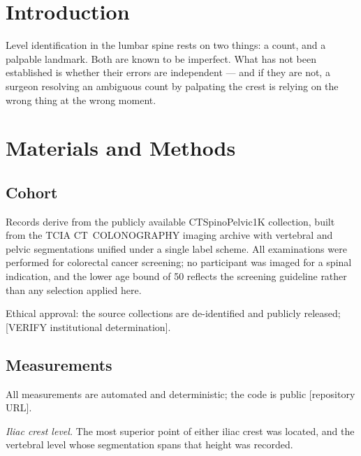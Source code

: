 \documentclass[11pt,a4paper]{article}
\begin{document}
\section{Introduction}


Level identification in the lumbar spine rests on two things: a count, and a palpable
landmark. Both are known to be imperfect. What has not been established is whether their
errors are independent --- and if they are not, a surgeon resolving an ambiguous count by
palpating the crest is relying on the wrong thing at the wrong moment.

\section{Materials and Methods}

\subsection{Cohort}

Records derive from the publicly available CTSpinoPelvic1K collection, built from the
TCIA CT~COLONOGRAPHY imaging archive with vertebral and pelvic segmentations unified
under a single label scheme. All examinations were performed for colorectal cancer
screening; no participant was imaged for a spinal indication, and the lower age bound of
50 reflects the screening guideline rather than any selection applied here.

Ethical approval: the source collections are de-identified and publicly released;
[VERIFY institutional determination].

\subsection{Measurements}

All measurements are automated and deterministic; the code is public [repository URL].

\emph{Iliac crest level.} The most superior point of either iliac crest was located, and
the vertebral level whose segmentation spans that height was recorded.
\end{document}
